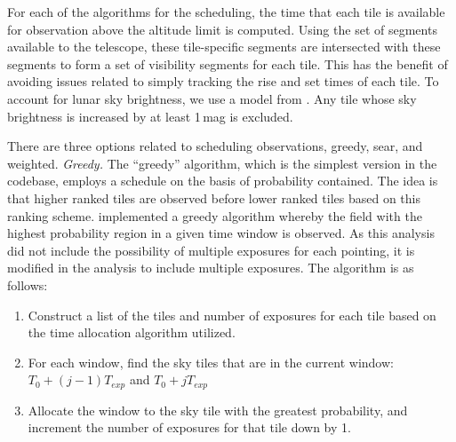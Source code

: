 \documentclass[twocolumn]{aastex62}
\begin{document}
For each of the algorithms for the scheduling, the time that each tile is available for observation above the altitude limit is computed.
Using the set of segments available to the telescope, these tile-specific segments  are intersected with these segments to form a set of visibility segments for each tile.
This has the benefit of avoiding issues related to simply tracking the rise and set times of each tile.
To account for lunar sky brightness, we use a model from \cite{CoSt2016b}. 
Any tile whose sky brightness is increased by at least 1\,mag is excluded.

There are three options related to scheduling observations, greedy, sear, and weighted.
\emph{Greedy.} The ``greedy'' algorithm, which is the simplest version in the codebase, employs a schedule on the basis of probability contained. The idea is that higher ranked tiles are observed before lower ranked tiles based on this ranking scheme. \cite{RaSi2017} implemented a greedy algorithm whereby the field with the highest probability region in a given time window is observed. As this analysis did not include the possibility of multiple exposures for each pointing, it is modified in the analysis to include multiple exposures. The algorithm is as follows:

\begin{enumerate}
\item Construct a list of the tiles and number of exposures for each tile based on the time allocation algorithm utilized.
\item For each window, find the sky tiles that are in the current window: $T_0 + (j-1) T_{exp}$ and $T_0 + j T_{exp}$
\item Allocate the window to the sky tile with the greatest probability, and increment the number of exposures for that tile down by 1.
\end{enumerate}
\end{document}
